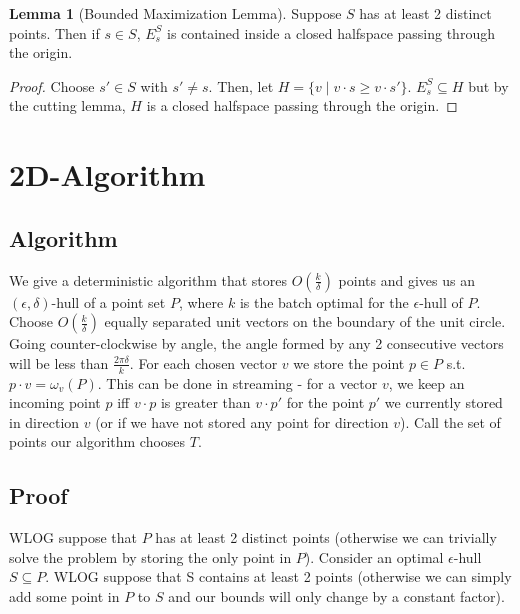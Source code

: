 \documentclass[12pt]{article}
\theoremstyle{definition}
\theoremstyle{lemma}
\newtheorem{lemma}{Lemma}[section]
\theoremstyle{theorem}
\begin{document}
\begin{lemma} [Bounded Maximization Lemma] Suppose $S$ has at least 2 distinct points. Then if $s \in S$, $E^S_s$ is contained inside a closed halfspace passing through the origin.
\end{lemma}

\begin{proof}
Choose $s' \in S$ with $s' \neq s$. Then, let $H = \{v \; | \; v \cdot s \geq v \cdot s'\}$. $E^S_s \subseteq H$ but by the cutting lemma, $H$ is a closed halfspace passing through the origin.
\end{proof}

\section{2D-Algorithm}

\subsection{Algorithm}

We give a deterministic algorithm that stores $O(\frac{k}{\delta})$ points and gives us an $(\epsilon, \delta)$-hull of a point set $P$, where $k$ is the batch optimal for the $\epsilon$-hull of $P$.
\\

Choose $O(\frac{k}{\delta})$ equally separated unit vectors on the boundary of the unit circle. Going counter-clockwise by angle, the angle formed by any 2 consecutive vectors will be less than $\frac{2\pi\delta}{k}$. For each chosen vector $v$ we store the point $p \in P$ s.t. $p \cdot v = \omega_v(P)$. This can be done in streaming - for a vector $v$, we keep an incoming point $p$ iff $v \cdot p$ is greater than $v \cdot p'$ for the point $p'$ we currently stored in direction $v$ (or if we have not stored any point for direction $v$). Call the set of points our algorithm chooses $T$.

\subsection{Proof}

WLOG suppose that $P$ has at least 2 distinct points (otherwise we can trivially solve the problem by storing the only point in $P$). Consider an optimal $\epsilon$-hull $S \subseteq P$. WLOG suppose that S contains at least 2 points (otherwise we can simply add some point in $P$ to $S$ and our bounds will only change by a constant factor). 
\\
\end{document}
